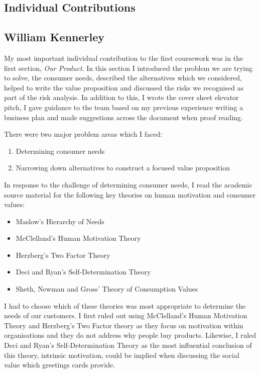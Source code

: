 \documentclass[10pt,a4paper]{article}
\begin{document}
\begin{appendices}
\section{Individual Contributions}\label{sec:individualContributions}
\subsection{William Kennerley}\label{subsec:williamKennerley}

My most important individual contribution to the first coursework was in the first section, \textit{Our Product}. In this section I introduced the problem we are trying to solve, the consumer needs, described the alternatives which we considered, helped to write the value proposition and discussed the risks we recognised as part of the risk analysis. In addition to this, I wrote the cover sheet elevator pitch, I gave guidance to the team based on my previous experience writing a business plan and made suggestions across the document when proof reading.

There were two major problem areas which I faced:
\begin{enumerate}
  \item Determining consumer needs
  \item Narrowing down alternatives to construct a focused value proposition
\end{enumerate}
In response to the challenge of determining consumer needs, I read the academic source material for the following key theories on human motivation and consumer values:
\begin{itemize}
  \item Maslow's Hierarchy of Needs
  \item McClelland's Human Motivation Theory
  \item Herzberg's Two Factor Theory
  \item Deci and Ryan's Self-Determination Theory
  \item Sheth, Newman and Gross' Theory of Consumption Values
\end{itemize}

I had to choose which of these theories was most appropriate to determine the needs of our customers. I first ruled out using McClelland's Human Motivation Theory and Herzberg's Two Factor theory as they focus on motivation within organisations and they do not address why people buy products. Likewise, I ruled Deci and Ryan's Self-Determination Theory as the most influential conclusion of this theory, intrinsic motivation, could be implied when discussing the social value \citep{sheth1991we} which greetings cards provide.


\end{appendices}
\end{document}
